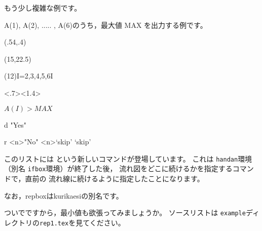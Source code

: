 \documentclass[a4j]{jarticle}
\begin{document}
もう少し複雑な例です。

A(1), A(2), ..... , A(6)のうち，最大値 MAX を出力する例です。

\begin{showEx}(.54,.4){}
\begin{caprm}
\begin{nagarezu}(15\zw,22.5\baselineskip)
  \downto
  \downto
  \begin{repbox*}%
      [.5](12\zw){I=2,3,4,5,6}{I}%
    \downto
    \begin{ifbox}<.7><1.4>%
          {\strut$A(I)>MAX$}%
      \begin{branch}{d}%
        \downto"Yes"%
        \downto[skip]%
        \pushcurrentP
      \end{branch}%
      \begin{branch}{r}%
        \rightto<n>"No"%
        \downto<n>`skip'%
        \leftto`skip'%
      \end{branch}%
    \end{ifbox}%
  \end{repbox*}%
  \downto
  \downto
\end{nagarezu}%
\end{caprm}
\end{showEx}

このリストには  という新しいコマンドが登場しています。
これは \texttt{handan}環境（別名 \texttt{ifbox}環境）が終了した後，
流れ図をどこに続けるかを指定するコマンドで，直前の
流れ線に続けるように指定したことになります。

なお，\textsf{repbox}は\textsf{kurikaesi}の別名です。

ついでですから，最小値も欲張ってみましょうか。
ソースリストは \texttt{example}ディレクトリの\texttt{rep1.tex}を見てください。

\begin{center}

\end{center}

\clearpage


\printindex
\end{document}
